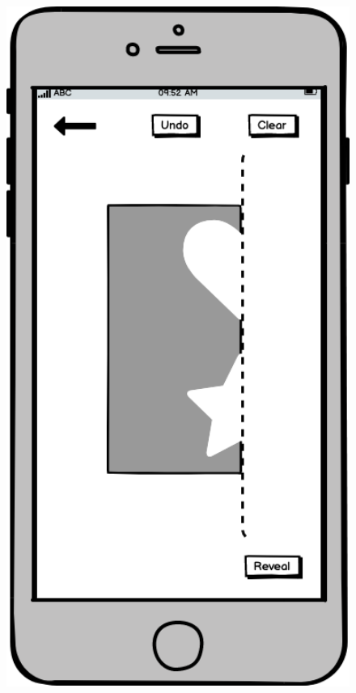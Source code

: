 \documentclass[11pt]{article}
\begin{document}
            \begin{figure}
                \begin{minipage}[c]{0.35\textwidth}
                \includegraphics[width=1\textwidth]{Images/Prototype/prototypeCreatePattern.png}
                \end{minipage}\hfill

\end{figure}
\end{document}
